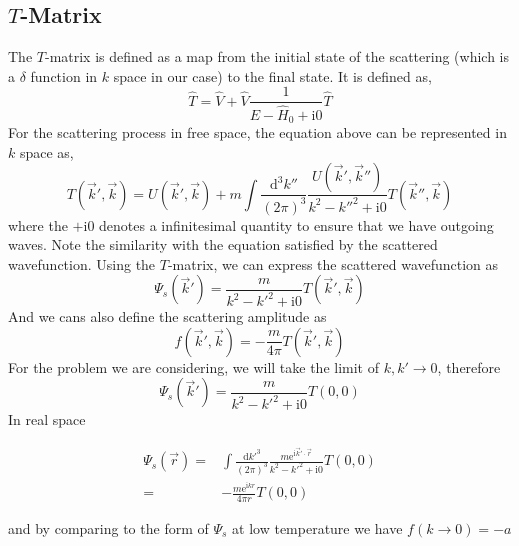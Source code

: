 \documentclass[aps,twocolumn,secnumarabic,balancelastpage,amsmath,amssymb,nofootinbib]{revtex4}
\newcommand{\ud}{\mathrm{d}}
\newcommand{\ue}{\mathrm{e}}
\newcommand{\ui}{\mathrm{i}}
\newcommand{\eqar}[1]
{
  \begin{align*}
    #1
  \end{align*}
}
\newcommand{\paren}[1]{{\left({#1}\right)}}
\begin{document}
\subsection{$T$-Matrix}
The $T$-matrix is defined as a map from the initial state of the scattering (which is a $\delta$ function in $k$ space in our case) to the final state. It is defined as,
\[\hat T=\hat V+\hat V\frac{1}{E-\hat H_0+\ui 0}\hat T\]
For the scattering process in free space, the equation above can be represented in $k$ space as,
\[T\paren{\vec k', \vec k}=U\paren{\vec k', \vec k}+m\int\frac{\ud^3k''}{\paren{2\pi}^3}\frac{U\paren{\vec k', \vec k''}}{k^2-k''^2+\ui 0}T\paren{\vec k'', \vec k}\]
where the $+\ui 0$ denotes a infinitesimal quantity to ensure that we have outgoing waves. Note the similarity with the equation satisfied by the scattered wavefunction. Using the $T$-matrix, we can express the scattered wavefunction as
\[\Psi_s\paren{\vec k'}=\frac{m}{k^2-k'^2+\ui 0}T\paren{\vec k', \vec k}\]
And we cans also define the scattering amplitude as
\[f\paren{\vec k', \vec k}=-\frac{m}{4\pi}T\paren{\vec k', \vec k}\]
For the problem we are considering, we will take the limit of $k, k'\rightarrow0$, therefore
\[\Psi_s\paren{\vec k'}=\frac{m}{k^2-k'^2+\ui 0}T\paren{0, 0}\]
In real space
\eqar{
  \Psi_s\paren{\vec r}=&\int\frac{\ud k'^3}{\paren{2\pi}^3}\frac{m\ue^{\ui\vec k'\cdot\vec r}}{k^2-k'^2+\ui 0}T\paren{0, 0}\\
  =&-\frac{m\ue^{\ui kr}}{4\pi r}T\paren{0, 0}
}
and by comparing to the form of $\Psi_s$ at low temperature we have $f(k\rightarrow0)=-a$
\end{document}
